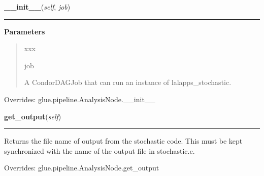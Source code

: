     \begin{boxedminipage}{\textwidth}

    \raggedright \textbf{\_\_init\_\_}(\textit{self}, \textit{job})

    \vspace{-1.5ex}

    \rule{\textwidth}{0.5\fboxrule}
    \vspace{1ex}

      \textbf{Parameters}
      \begin{quote}
        \begin{Ventry}{xxx}

          \item[job]

          A CondorDAGJob that can run an instance of lalapps\_stochastic.

        \end{Ventry}

      \end{quote}

    \vspace{1ex}

      Overrides: glue.pipeline.AnalysisNode.\_\_init\_\_

    \end{boxedminipage}

    \label{stochastic:StochasticNode:get_output}
    \vspace{0.5ex}

    \begin{boxedminipage}{\textwidth}

    \raggedright \textbf{get\_output}(\textit{self})

    \vspace{-1.5ex}

    \rule{\textwidth}{0.5\fboxrule}
    Returns the file name of output from the stochastic code. This must 
    be kept synchronized with the name of the output file in 
    stochastic.c.

    \vspace{1ex}

      Overrides: glue.pipeline.AnalysisNode.get\_output

    \end{boxedminipage}

    \label{stochastic:StochasticNode:set_cache_one}
    \vspace{0.5ex}

